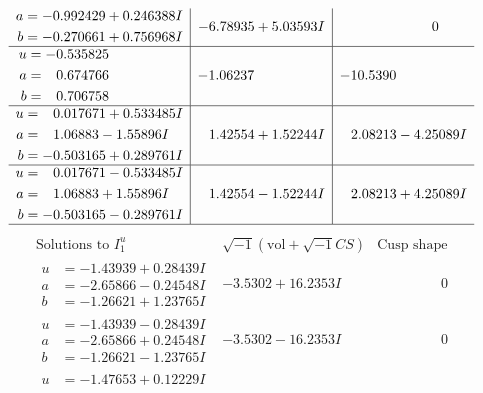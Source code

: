 \documentclass[1p]{elsarticle_modified}
\theoremstyle{definition}
\newcommand{\I}{\sqrt{-1}}
\begin{document}
$$\begin{array}{c|c|c}
\begin{aligned}
a &= -0.992429 + 0.246388 I \\
b &= -0.270661 + 0.756968 I\end{aligned}
 & -6.78935 + 5.03593 I & \phantom{-0.000000 } 0 \\ \hline\begin{aligned}
u &= -0.535825\phantom{ +0.000000I} \\
a &= \phantom{-}0.674766\phantom{ +0.000000I} \\
b &= \phantom{-}0.706758\phantom{ +0.000000I}\end{aligned}
 & -1.06237\phantom{ +0.000000I} & -10.5390\phantom{ +0.000000I} \\ \hline\begin{aligned}
u &= \phantom{-}0.017671 + 0.533485 I \\
a &= \phantom{-}1.06883 - 1.55896 I \\
b &= -0.503165 + 0.289761 I\end{aligned}
 & \phantom{-}1.42554 + 1.52244 I & \phantom{-}2.08213 - 4.25089 I \\ \hline\begin{aligned}
u &= \phantom{-}0.017671 - 0.533485 I \\
a &= \phantom{-}1.06883 + 1.55896 I \\
b &= -0.503165 - 0.289761 I\end{aligned}
 & \phantom{-}1.42554 - 1.52244 I & \phantom{-}2.08213 + 4.25089 I\\
 \hline 
 \end{array}$$\newpage$$\begin{array}{c|c|c}  
\text{Solutions to }I^u_{1}& \I (\text{vol} + \sqrt{-1}CS) & \text{Cusp shape}\\
 \hline 
\begin{aligned}
u &= -1.43939 + 0.28439 I \\
a &= -2.65866 - 0.24548 I \\
b &= -1.26621 + 1.23765 I\end{aligned}
 & -3.5302 + 16.2353 I & \phantom{-0.000000 } 0 \\ \hline\begin{aligned}
u &= -1.43939 - 0.28439 I \\
a &= -2.65866 + 0.24548 I \\
b &= -1.26621 - 1.23765 I\end{aligned}
 & -3.5302 - 16.2353 I & \phantom{-0.000000 } 0 \\ \hline\begin{aligned}
u &= -1.47653 + 0.12229 I \\

\end{aligned}
\end{array}$$
\end{document}
